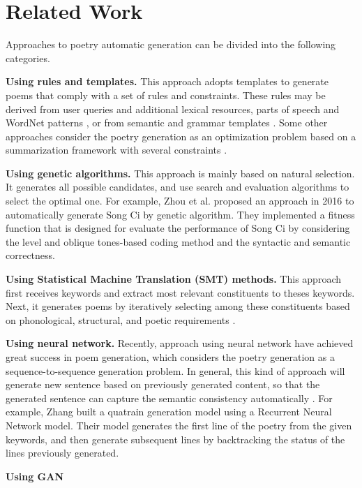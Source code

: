 \section{Related Work}   
Approaches to poetry automatic generation can be divided into the following categories.

\textbf{Using rules and templates.}
%
This approach adopts templates to generate poems that comply with a set of rules and constraints.
%
These rules may be derived from user queries and additional lexical resources\cite{wu2009new,tosa2008hitch},  parts of speech and WordNet patterns \cite{netzer2009gaiku},  or from semantic and grammar templates \cite{oliveira2012poetryme}.
% 
Some other approaches consider the poetry generation as an optimization problem based on a summarization framework with several constraints \cite{yan2013poet}.

\textbf {Using genetic algorithms.} This approach is mainly based on natural selection. It generates all possible candidates, and use search and evaluation algorithms to select the optimal one\cite{manurung2004evolutionary,manurung2012using}.
%
For example, Zhou et al.\cite{zhou2010genetic} proposed an approach in 2016 to automatically generate Song Ci by genetic algorithm.
%
They implemented a fitness function that is designed for evaluate the performance of Song Ci by considering the level and oblique tones-based coding method and the syntactic and semantic correctness.


\textbf{Using Statistical Machine Translation (SMT) methods.} 
 This approach first receives keywords and extract most relevant constituents to theses keywords.  Next, it generates poems by iteratively selecting among these constituents based on phonological, structural, and poetic requirements \cite{jiang2008generating}.  

\textbf{Using neural network.}  Recently, approach using neural network have achieved great success in poem generation, which considers the poetry generation as a sequence-to-sequence generation problem.
% 
In general, this kind of approach will generate new sentence based on previously generated content, so that the generated sentence can capture the semantic consistency automatically \cite{wang2016chinese,bahdanau2014neural}.
%
For example, Zhang \etal built a quatrain generation model using a Recurrent Neural Network model.  Their model generates the first line of the poetry from the given keywords, and then generate subsequent lines by backtracking the status of the lines previously generated.
% 

\textbf{Using GAN} 